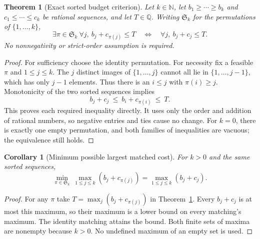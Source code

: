 \documentclass[11pt]{article}
\newtheorem{theorem}[definition]{Theorem}
\newtheorem{corollary}[definition]{Corollary}
\theoremstyle{remark}
\newcommand{\N}{\mathbb N}
\newcommand{\Q}{\mathbb Q}
\begin{document}
\begin{theorem}[Exact sorted budget criterion]
\label{thm:sorted}
Let $k\in\N$, let $b_1\ge\cdots\ge b_k$ and
$c_1\le\cdots\le c_k$ be rational sequences, and let $T\in\Q$.
Writing $\mathfrak S_k$ for the permutations of $\{1,\ldots,k\}$,
\[
 \boxed{\quad
 \exists\pi\in\mathfrak S_k\ \forall j,\ b_j+c_{\pi(j)}\le T
 \quad\Longleftrightarrow\quad
 \forall j,\ b_j+c_j\le T.
 \quad}
\]
No nonnegativity or strict-order assumption is required.
\end{theorem}
\begin{proof}
For sufficiency choose the identity permutation. For necessity fix a
feasible $\pi$ and $1\le j\le k$. The $j$ distinct images of
$\{1,\ldots,j\}$ cannot all lie in $\{1,\ldots,j-1\}$, which has only
$j-1$ elements. Thus there is an $i\le j$ with $\pi(i)\ge j$. Monotonicity
of the two sorted sequences implies
\[
 b_j+c_j\ \le\ b_i+c_{\pi(i)}\ \le\ T.
\]
This proves each required inequality directly. It uses only the order and
addition of rational numbers, so negative entries and ties cause no change.
For $k=0$, there is exactly one empty permutation, and both families of
inequalities are vacuous; the equivalence still holds.
\end{proof}

\begin{corollary}[Minimum possible largest matched cost]
\label{cor:minimax}
For $k>0$ and the same sorted sequences,
\[
 \min_{\pi\in\mathfrak S_k}\ \max_{1\le j\le k}
       (b_j+c_{\pi(j)})
 =\max_{1\le j\le k}(b_j+c_j).
\]
\end{corollary}
\begin{proof}
For any $\pi$ take $T=\max_j(b_j+c_{\pi(j)})$ in
Theorem~\ref{thm:sorted}. Every $b_j+c_j$ is at most this maximum, so their
maximum is a lower bound on every matching's maximum. The identity matching
attains the bound. Both finite sets of maxima are nonempty because $k>0$.
No undefined maximum of an empty set is used.
\end{proof}
\end{document}

